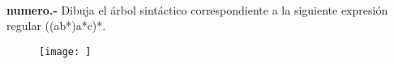 \paragraph{}
\textbf{{numero}.-} Dibuja el árbol sintáctico correspondiente a la siguiente expresión regular ((a\textbar b*)a*c)*. 
\begin{figure}[ht!]
\centering
\texttt{[image: ]}
\end{figure}